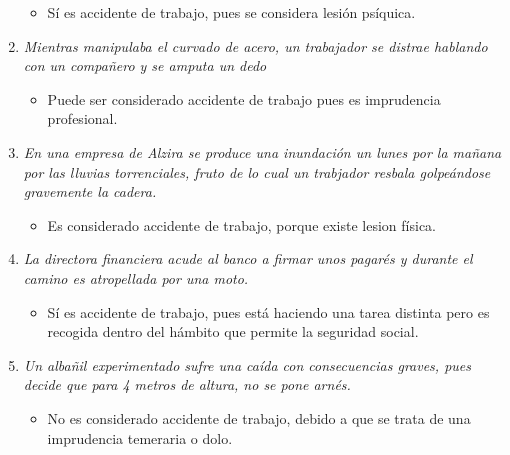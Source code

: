\documentclass{article}
\begin{document}
\begin{enumerate}[label=(\alph*)]
            \begin{itemize}
              \item Sí es accidente de trabajo, pues se considera lesión psíquica.
            \end{itemize}
          \item \textit{Mientras manipulaba el curvado de acero, un trabajador se distrae hablando con un compañero y se amputa un dedo}
            \begin{itemize}
              \item Puede ser considerado accidente de trabajo pues es imprudencia profesional.
            \end{itemize}
          \item \textit{En una empresa de Alzira se produce una inundación un lunes por la mañana por las lluvias torrenciales, fruto de lo cual un trabjador resbala golpeándose gravemente la cadera.}
            \begin{itemize}
              \item Es considerado accidente de trabajo, porque existe lesion física.
            \end{itemize}
          \item \textit{La directora financiera acude al banco a firmar unos pagarés y durante el camino es atropellada por una moto.}
            \begin{itemize}
              \item Sí es accidente de trabajo, pues está haciendo una tarea distinta pero es recogida dentro del hámbito que permite la seguridad social.
            \end{itemize}
          \item \textit{Un albañil experimentado sufre una caída con consecuencias graves, pues decide que para 4 metros de altura, no se pone arnés.}
            \begin{itemize}
              \item No es considerado accidente de trabajo, debido a que se trata de una imprudencia temeraria o dolo.
            \end{itemize}
        \end{enumerate}
    
    \newpage
\end{document}
